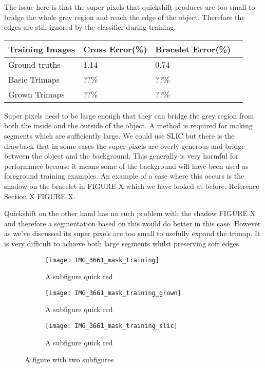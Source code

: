 \documentclass[12pt]{IIBproject}
\begin{document}
 The issue here is that the super pixels that quickshift produces are too small to bridge the whole grey region and reach the edge of the object. Therefore the edges are still ignored by the classifier during training. 
\begin{center}
    \begin{tabular}{ | l | l | l | p{5cm} |}
    \hline
    Training Images & Cross Error(\%) & Bracelet Error(\%) \\ \hline
    Ground truths & 1.14 & 0.74 \\ \hline
    Basic Trimaps & ??\% & ??\% \\
    \hline
    Grown Trimaps & ??\% & ??\% \\
    \hline
    \end{tabular}
    
\end{center}
Super pixels need to be large enough that they can bridge the grey region from both the inside and the outside of the object. A method is required for making segments which are sufficiently large. We could use SLIC but there is the drawback that in some cases the super pixels are overly generous and bridge between the object and the background. This generally is very harmful for performance because it means some of the background will have been used as foreground training examples. An example of a case where this occurs is the shadow on the bracelet in FIGURE X which we have looked at before. Reference Section X FIGURE X.

Quickshift on the other hand has no such problem with the shadow FIGURE X and therefore a segmentation based on this would do better in this case. However as we've discussed its super pixels are too small to usefully expand the trimap. It is very difficult to achieve both large segments whilst preserving soft edges. 

\begin{figure}[H]
\centering
\begin{subfigure}{.45\textwidth}
  \centering
  \texttt{[image: IMG\_3661\_mask\_training]}
  \caption{A subfigure quick red}
  \label{fig:sub2}
\end{subfigure}
\begin{subfigure}{.45\textwidth}
  \centering
  \texttt{[image: IMG\_3661\_mask\_training\_grown]}
  \caption{A subfigure quick red}
  \label{fig:sub2}
\end{subfigure}
\begin{subfigure}{.45\textwidth}
  \centering
  \texttt{[image: IMG\_3661\_mask\_training\_slic]}
  \caption{A subfigure quick red}
  \label{fig:sub2}
\end{subfigure}



\caption{A figure with two subfigures}
\label{fig:test}
\end{figure}
\end{document}
